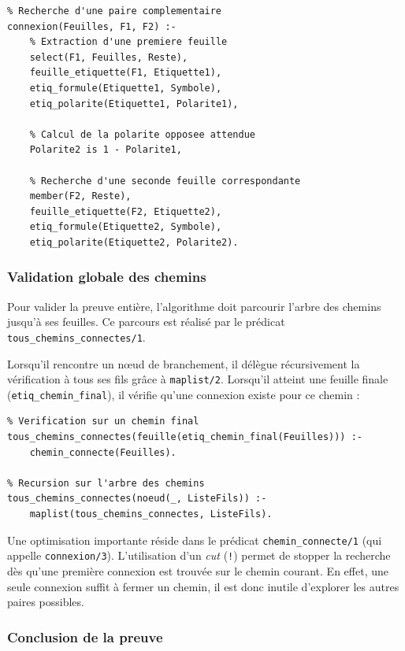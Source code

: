 \documentclass[12pt, a4paper]{article}
\begin{document}
\begin{lstlisting}
% Recherche d'une paire complementaire
connexion(Feuilles, F1, F2) :-
    % Extraction d'une premiere feuille
    select(F1, Feuilles, Reste),
    feuille_etiquette(F1, Etiquette1),
    etiq_formule(Etiquette1, Symbole),
    etiq_polarite(Etiquette1, Polarite1),
    
    % Calcul de la polarite opposee attendue
    Polarite2 is 1 - Polarite1,
    
    % Recherche d'une seconde feuille correspondante
    member(F2, Reste),
    feuille_etiquette(F2, Etiquette2),
    etiq_formule(Etiquette2, Symbole),
    etiq_polarite(Etiquette2, Polarite2).
\end{lstlisting}

\subsubsection{Validation globale des chemins}

Pour valider la preuve entière, l'algorithme doit parcourir l'arbre des chemins jusqu'à ses feuilles. Ce parcours est réalisé par le prédicat \texttt{tous\_chemins\_connectes/1}.

Lorsqu'il rencontre un nœud de branchement, il délègue récursivement la vérification à tous ses fils grâce à \texttt{maplist/2}. Lorsqu'il atteint une feuille finale (\texttt{etiq\_chemin\_final}), il vérifie qu'une connexion existe pour ce chemin :

\begin{lstlisting}
% Verification sur un chemin final
tous_chemins_connectes(feuille(etiq_chemin_final(Feuilles))) :-
    chemin_connecte(Feuilles).

% Recursion sur l'arbre des chemins
tous_chemins_connectes(noeud(_, ListeFils)) :-
    maplist(tous_chemins_connectes, ListeFils).
\end{lstlisting}

Une optimisation importante réside dans le prédicat \texttt{chemin\_connecte/1} (qui appelle \texttt{connexion/3}). L'utilisation d'un \textit{cut} (\texttt{!}) permet de stopper la recherche dès qu'une première connexion est trouvée sur le chemin courant. En effet, une seule connexion suffit à fermer un chemin, il est donc inutile d'explorer les autres paires possibles.

\subsubsection{Conclusion de la preuve}
\end{document}
